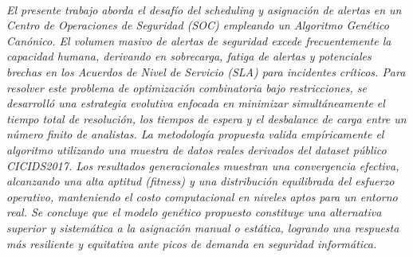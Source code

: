 \documentclass[12pt,a4paper,twocolumn]{article}
\begin{document}

 \\
{\fontsize{10}{12}\selectfont\itshape 
El presente trabajo aborda el desafío del scheduling y asignación de alertas en un Centro de Operaciones de Seguridad (SOC) empleando un Algoritmo Genético Canónico. El volumen masivo de alertas de seguridad excede frecuentemente la capacidad humana, derivando en sobrecarga, fatiga de alertas y potenciales brechas en los Acuerdos de Nivel de Servicio (SLA) para incidentes críticos. Para resolver este problema de optimización combinatoria bajo restricciones, se desarrolló una estrategia evolutiva enfocada en minimizar simultáneamente el tiempo total de resolución, los tiempos de espera y el desbalance de carga entre un número finito de analistas. La metodología propuesta valida empíricamente el algoritmo utilizando una muestra de datos reales derivados del dataset público CICIDS2017. Los resultados generacionales muestran una convergencia efectiva, alcanzando una alta aptitud (fitness) y una distribución equilibrada del esfuerzo operativo, manteniendo el costo computacional en niveles aptos para un entorno real. Se concluye que el modelo genético propuesto constituye una alternativa superior y sistemática a la asignación manual o estática, logrando una respuesta más resiliente y equitativa ante picos de demanda en seguridad informática.\par}
\vspace{0.8em}
\end{document}
